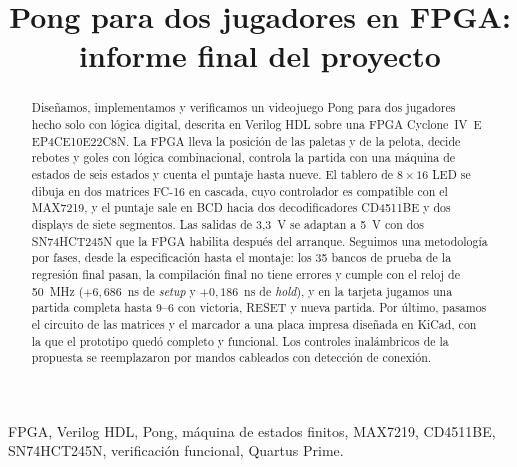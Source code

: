 \documentclass[conference,a4paper]{IEEEtran}
\begin{document}
\title{Pong para dos jugadores en FPGA:\\ informe final del proyecto}

\author{
}

\maketitle

\begin{abstract}
Diseñamos, implementamos y verificamos un videojuego Pong para dos jugadores hecho solo con lógica digital, descrita en Verilog HDL sobre una FPGA Cyclone~IV~E EP4CE10E22C8N. La FPGA lleva la posición de las paletas y de la pelota, decide rebotes y goles con lógica combinacional, controla la partida con una máquina de estados de seis estados y cuenta el puntaje hasta nueve. El tablero de $8\times16$ LED se dibuja en dos matrices FC-16 en cascada, cuyo controlador es compatible con el MAX7219, y el puntaje sale en BCD hacia dos decodificadores CD4511BE y dos displays de siete segmentos. Las salidas de 3,3~V se adaptan a 5~V con dos SN74HCT245N que la FPGA habilita después del arranque. Seguimos una metodología por fases, desde la especificación hasta el montaje: los 35 bancos de prueba de la regresión final pasan, la compilación final no tiene errores y cumple con el reloj de 50~MHz ($+6{,}686$~ns de \textit{setup} y $+0{,}186$~ns de \textit{hold}), y en la tarjeta jugamos una partida completa hasta 9--6 con victoria, RESET y nueva partida. Por último, pasamos el circuito de las matrices y el marcador a una placa impresa diseñada en KiCad, con la que el prototipo quedó completo y funcional. Los controles inalámbricos de la propuesta se reemplazaron por mandos cableados con detección de conexión.
\end{abstract}

\begin{IEEEkeywords}
FPGA, Verilog HDL, Pong, máquina de estados finitos, MAX7219, CD4511BE, SN74HCT245N, verificación funcional, Quartus Prime.
\end{IEEEkeywords}
\end{document}
